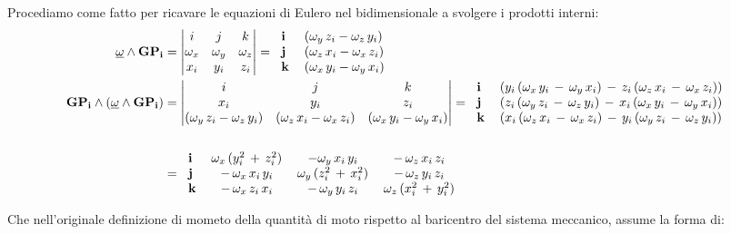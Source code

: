 Procediamo come fatto per ricavare le equazioni di Eulero nel bidimensionale a svolgere i prodotti interni:
\begin{align*}
	\und{\omega}\wedge\mathbf{GP_i} &= 
	\begin{vmatrix}
		i&j&k\\
		\omega_x&\omega_y&\omega_z\\
		x_i&y_i&z_i
	\end{vmatrix}
	= \begin{tabular}{ll}$\mathbf{i}$&$(\omega_y\,z_i - \omega_z\,y_i)$\\
	$\mathbf{j}$&$(\omega_z\,x_i - \omega_x\,z_i)$\\
	$\mathbf{k}$&$(\omega_x\,y_i - \omega_y\,x_i)$
	\end{tabular}\\
	\mathbf{GP_i}\wedge(\und{\omega}\wedge\mathbf{GP_i})&=
	\begin{vmatrix}
	i&j&k\\
	x_i&y_i&z_i\\
	(\omega_y\,z_i - \omega_z\,y_i)&(\omega_z\,x_i - \omega_x\,z_i)&(\omega_x\,y_i - \omega_y\,x_i)
	\end{vmatrix}
	= \begin{tabular}{ll}
	$\mathbf{i}$&$ (y_i\,(\omega_x\,y_i\,-\,\omega_y\,x_i )\,-\,z_i\,(\omega_z\,x_i\,-\,\omega_x\,z_i)) $\\
	$\mathbf{j}$&$(z_i\,(\omega_y\,z_i\,-\,\omega_z\,y_i)\,-\,x_i\,(\omega_x\,y_i\,-\,\omega_y\,x_i))$\\
	$\mathbf{k}$&$(x_i\,(\omega_z\,x_i\,-\,\omega_x\,z_i)\,-\,y_i\,(\omega_y\,z_i\,-\,\omega_z\,y_i))$\\
	\end{tabular}\\
	\\
	&=  \begin{tabular}{lccc}
	$\mathbf{i}$&$ \omega_x\,(y_i^2\,+\,z_i^2)$&$-\omega_y\,x_i\,y_i$&$-\,\omega_z\,x_i\,z_i $\\
	$\mathbf{j}$&$-\,\omega_x\,x_i\,y_i$&$\omega_y\,(z_i^2\,+\,x_i^2)$&$-\,\omega_z\,y_i\,z_i$\\
	$\mathbf{k}$&$-\,\omega_x\,z_i\,x_i$&$-\,\omega_y\,y_i\,z_i$&$\omega_z\,(x_i^2\,+\,y_i^2)$\\
	\end{tabular}
\end{align*}

Che nell'originale definizione di mometo della quantità di moto rispetto al baricentro del sistema meccanico, assume la forma di:

